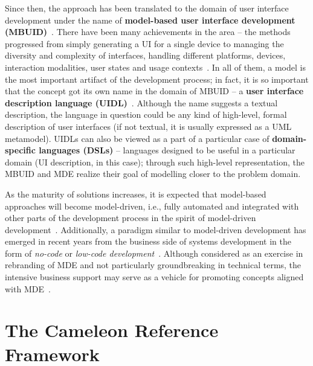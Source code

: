 Since then, the approach has been translated to the domain of user interface development under the name of \textbf{model-based user interface development (MBUID)}~\cite{Puerta1994}.
There have been many achievements in the area – the methods progressed from simply generating a UI for a single device to managing the diversity and complexity of interfaces, handling different platforms, devices, interaction modalities, user states and usage contexts~\cite{Meixner2011}.
In all of them, a model is the most important artifact of the development process;
in fact, it is so important that the concept got its own name in the domain of MBUID -- a \textbf{user interface description language (UIDL)}~\cite{guerrero_garcia_theoretical_2009}.
Although the name suggests a textual description, the language in question could be any kind of high-level, formal description of user interfaces (if not textual, it is usually expressed as a UML metamodel).
UIDLs can also be viewed as a part of a particular case of \textbf{domain-specific languages (DSLs)} -- languages designed to be useful in a particular domain (UI description, in this case);
through such high-level representation, the MBUID and MDE realize their goal of modelling closer to the problem domain.

As the maturity of solutions increases, it is expected that model-based approaches will become model-driven, i.e., fully automated and integrated with other parts of the development process in the spirit of model-driven development~\cite{Ruiz2018}.
Additionally, a paradigm similar to model-driven development has emerged in recent years from the business side of systems development in the form of \emph{no-code} or \emph{low-code development}~\cite{Rymer2019}.
Although considered as an exercise in rebranding of MDE and not particularly groundbreaking in technical terms, the intensive business support may serve as a vehicle for promoting concepts aligned with MDE~\cite{Bock2021}.

\section{The Cameleon Reference Framework}\label{sec:the-cameleon-reference-framework}

